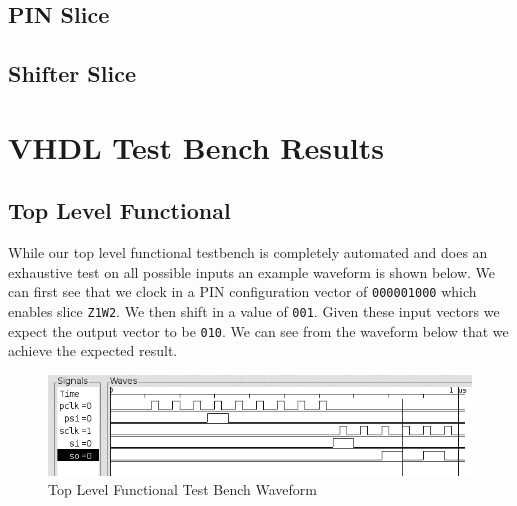 \documentclass{article}
\begin{document}
    \subsection{PIN Slice}
        
    \subsection{Shifter Slice}
        

\section{VHDL Test Bench Results}
    \subsection{Top Level Functional}
        While our top level functional testbench is completely automated and
        does an exhaustive test on all possible inputs an example waveform is
        shown below. We can first see that we clock in a PIN configuration
        vector of \texttt{000001000} which enables slice \texttt{Z1W2}. We then
        shift in a value of \texttt{001}. Given these input vectors we expect
        the output vector to be \texttt{010}. We can see from the waveform
        below that we achieve the expected result.
        \begin{figure}[H]
            \centering
            \includegraphics[width=\linewidth]{../../doc/vhdl_sim_pics/top.png}
            \caption{Top Level Functional Test Bench Waveform}
        \end{figure}
\end{document}
